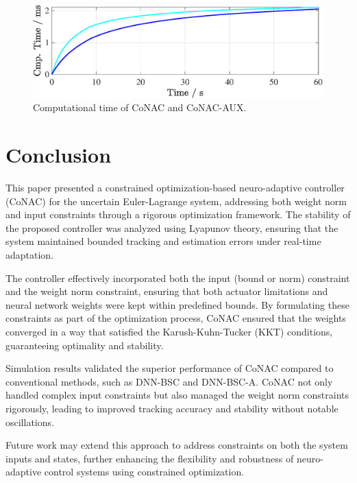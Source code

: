 \documentclass[final,5p,times,twocolumn,authoryear]{elsarticle}
\newcommand*{\figSizeOneCol}{0.98}
\begin{document}
\begin{figure}[t]
    \centering
        \includegraphics[width=\figSizeOneCol\linewidth]
        {
          src/measurement/figures/Fig10.eps
        }%
    \caption{
        Computational time of CoNAC and CoNAC-AUX. 
    }
    \label{fig:ctrl:real:result:cmp:time}
  \end{figure}

\section{Conclusion}\label{sec:conclusion}

This paper presented a constrained optimization-\allowbreak based neuro-adaptive controller (CoNAC) for the uncertain Euler-Lagrange system, addressing both weight norm and input constraints through a rigorous optimization framework. The stability of the proposed controller was analyzed using Lyapunov theory, ensuring that the system maintained bounded tracking and estimation errors under real-time adaptation.

The controller effectively incorporated both the input (bound or norm) constraint and the weight norm constraint, ensuring that both actuator limitations and neural network weights were kept within predefined bounds. By formulating these constraints as part of the optimization process, CoNAC ensured that the weights converged in a way that satisfied the Karush-Kuhn-Tucker (KKT) conditions, guaranteeing optimality and stability.

Simulation results validated the superior performance of CoNAC compared to conventional methods, such as DNN-BSC and DNN-BSC-A. CoNAC not only handled complex input constraints but also managed the weight norm constraints rigorously, leading to improved tracking accuracy and stability without notable oscillations.

Future work may extend this approach to address constraints on both the system inputs and states, further enhancing the flexibility and robustness of neuro-adaptive control systems using constrained optimization.
\end{document}
